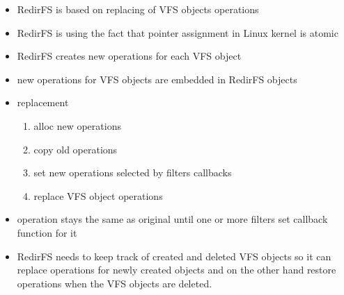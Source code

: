 \documentclass[30pt,a4paper,landscape,headrule,footrule]{foils}
\begin{document}

\begin{itemize}
\item RedirFS is based on replacing of VFS objects operations
\item RedirFS is using the fact that pointer assignment in Linux kernel is
atomic
\item RedirFS creates new operations for each VFS object
\item new operations for VFS objects are embedded in RedirFS objects
\end{itemize}

\begin{itemize}
\item replacement
\begin{enumerate}
\item alloc new operations
\item copy old operations
\item set new operations selected by filters callbacks
\item replace VFS object operations
\end{enumerate}
\end{itemize}

\begin{itemize}
\item operation stays the same as original until one or more filters set
callback function for it
\item RedirFS needs to keep track of created and deleted VFS objects so it can
replace operations for newly created objects and on the other hand restore
operations when the VFS objects are deleted.
\end{itemize}
\end{document}
